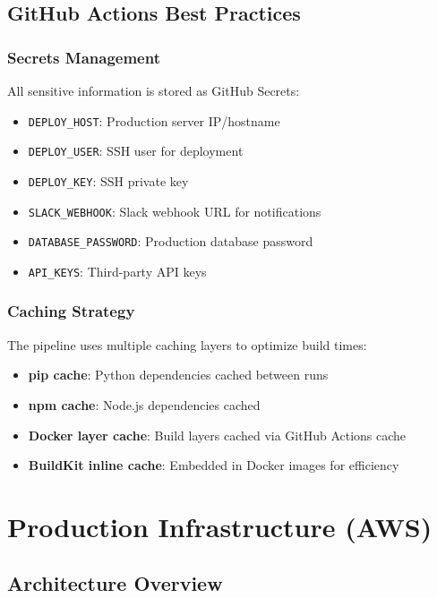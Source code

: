 \documentclass{report}
\begin{document}
\section{GitHub Actions Best Practices}

\subsection{Secrets Management}

All sensitive information is stored as GitHub Secrets:

\begin{itemize}
  \item \texttt{DEPLOY\_HOST}: Production server IP/hostname
  \item \texttt{DEPLOY\_USER}: SSH user for deployment
  \item \texttt{DEPLOY\_KEY}: SSH private key
  \item \texttt{SLACK\_WEBHOOK}: Slack webhook URL for notifications
  \item \texttt{DATABASE\_PASSWORD}: Production database password
  \item \texttt{API\_KEYS}: Third-party API keys
\end{itemize}

\subsection{Caching Strategy}

The pipeline uses multiple caching layers to optimize build times:

\begin{itemize}
  \item \textbf{pip cache}: Python dependencies cached between runs
  \item \textbf{npm cache}: Node.js dependencies cached
  \item \textbf{Docker layer cache}: Build layers cached via GitHub Actions cache
  \item \textbf{BuildKit inline cache}: Embedded in Docker images for efficiency
\end{itemize}

\chapter{Production Infrastructure (AWS)}

\section{Architecture Overview}
\end{document}
